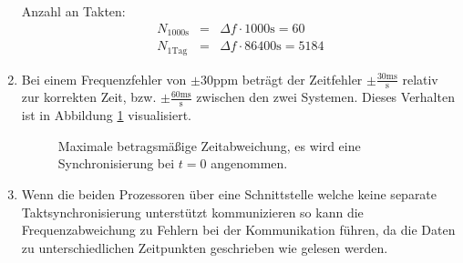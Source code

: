 \documentclass[DIN, pagenumber=false, fontsize=11pt, parskip=half]{scrartcl}
\begin{document}
\begin{enumerate}[label=\alph*)]
            Anzahl an Takten:
            \begin{eqnarray}
                N_{1000\text{s}} &=& \Delta f \cdot 1000 \text{s} = 60 \\
                N_{1 \text{Tag} } &=& \Delta f \cdot 86400 \text{s} = 5184 
            \end{eqnarray}
        \item 
            Bei einem Frequenzfehler von $\pm30$ppm beträgt der Zeitfehler
            $\pm \frac{30 \text{ms}}{\text{s}}$ relativ zur korrekten Zeit,
            bzw. $\pm \frac{60 \text{ms}}{\text{s}}$ zwischen den zwei Systemen.
            Dieses Verhalten ist in Abbildung \ref{fig:skew} visualisiert.
            
            \begin{figure}[h]
                \centering
                \caption{Maximale betragsmäßige Zeitabweichung, es wird eine
                    Synchronisierung bei $t=0$ angenommen.}
                \label{fig:skew}
            \end{figure}
        \item
            Wenn die beiden Prozessoren über eine Schnittstelle welche keine
            separate Taktsynchronisierung unterstützt kommunizieren so kann die
            Frequenzabweichung zu Fehlern bei der Kommunikation führen, da die
            Daten zu unterschiedlichen Zeitpunkten geschrieben wie gelesen werden.
    \end{enumerate}
\end{document}
